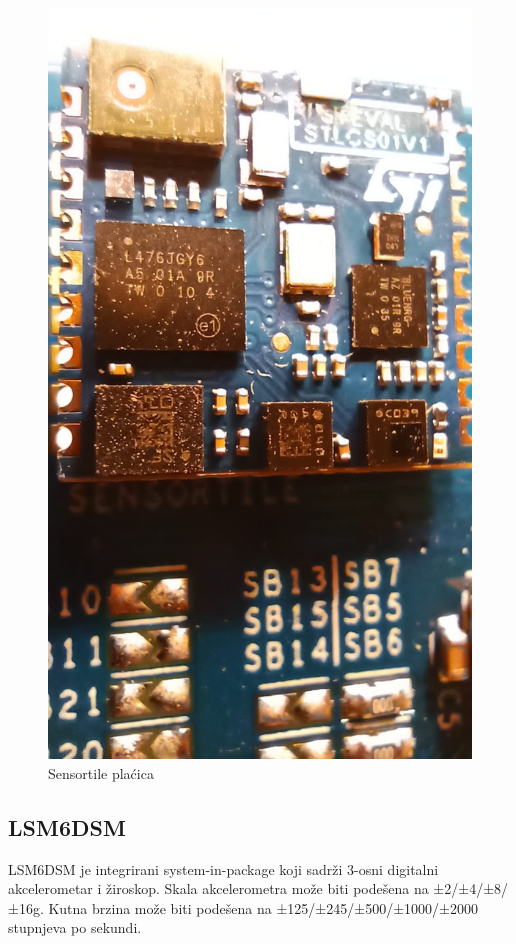 \documentclass[times, utf8, diplomski]{diplomski}
\begin{document}
\begin{figure}[H]
\includegraphics[scale=0.14]{tile_close.jpeg}
\centering
\caption{Sensortile plaćica}
\end{figure}

\subsection{LSM6DSM}
LSM6DSM \cite{LSM6DSM} je integrirani system-in-package koji sadrži 3-osni digitalni akcelerometar i žiroskop. Skala akcelerometra može biti podešena na ±2/±4/±8/±16g. Kutna brzina može biti podešena na
±125/±245/±500/±1000/±2000 stupnjeva po sekundi.
\end{document}

